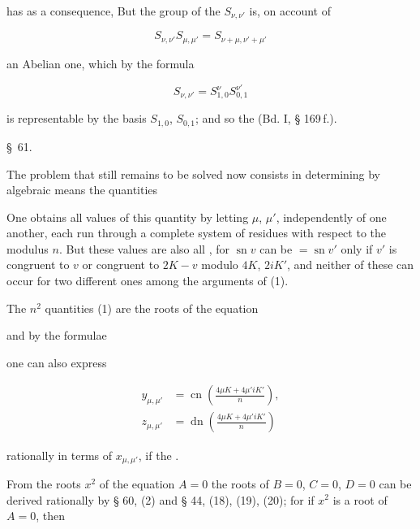 
has as a consequence,  But the group
of the $S_{\nu,\nu'}$ is, on account of

\[
S_{\nu,\nu'} S_{\mu,\mu'} = S_{\nu+\mu,\nu'+\mu'}
\]

an Abelian one, which by the formula

\[
S_{\nu,\nu'} = S_{1,0}^{\nu} S_{0,1}^{\nu'}
\]

is representable by the basis $S_{1,0}$, $S_{0,1}$; and so the  (Bd. I, § 169\,f.).

\begin{center}
\S\ 61. \quad {}
\end{center}

The problem that still remains to be solved now consists in determining by
algebraic means the quantities


One obtains all values of this quantity by letting $\mu$, $\mu'$, independently
of one another, each run through a complete system of residues
with respect to the modulus $n$. But these values are also
all , for $\operatorname{sn} v$ can be
$= \operatorname{sn} v'$ only if $v'$ is congruent to $v$ or congruent to $2K - v$
modulo $4K$, $2iK'$, and neither of these can occur for two different ones
among the arguments of (1).

The $n^2$ quantities (1) are the roots of the equation


and by the formulae


one can also express

\[
\begin{aligned}
y_{\mu,\mu'} &= \operatorname{cn}\left(\frac{4\mu K + 4\mu' iK'}{n}\right),\\
z_{\mu,\mu'} &= \operatorname{dn}\left(\frac{4\mu K + 4\mu' iK'}{n}\right)
\end{aligned}
\]

rationally in terms of $x_{\mu,\mu'}$, if the .

From the roots $x^2$ of the equation $A = 0$ the roots of $B = 0$,
$C = 0$, $D = 0$ can be derived rationally by
§ 60, (2) and § 44, (18), (19), (20); for if $x^2$ is a root
of $A = 0$, then
